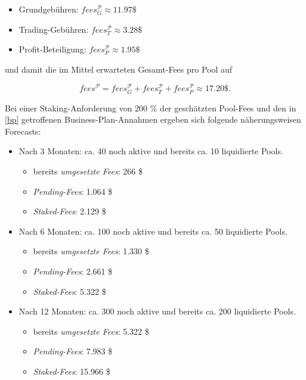 \begin{Fazit}
\begin{itemize}
	\item Grundgebühren: $fees_{G}^{\mathcal{P}} \approx 11.97\$ $
	\item Trading-Gebühren: $fees_{T}^{\mathcal{P}} \approx 3.28 \$ $
	\item Profit-Beteiligung: $fees_{P}^{\mathcal{P}} \approx 1.95 \$ $
\end{itemize}

und damit die im Mittel erwarteten Gesamt-Fees pro Pool auf

\begin{equation*}
  fees^{\mathcal{P}} = fees_{G}^{\mathcal{P}} + fees_{T}^{\mathcal{P}} + fees_{P}^{\mathcal{P}} \approx 17.20 \$. 
\end{equation*}

\vspace{0.67cm}

Bei einer Staking-Anforderung von 200 \% der geschätzten Pool-Fees  und den in \ref{bp} getroffenen Business-Plan-Annahmen ergeben sich folgende näherungsweisen Forecasts:

\begin{itemize}
	\item Nach 3 Monaten: ca. 40 noch aktive und bereits ca. 10 liquidierte Pools.
	\begin{itemize}
		\item bereits \textit{umgesetzte Fees}: 266 \$ 
		\item \textit{Pending-Fees}: 1.064 \$ 
		\item \textit{Staked-Fees}: 2.129 \$ 
	\end{itemize}
	\item Nach 6 Monaten: ca. 100 noch aktive und bereits ca. 50 liquidierte Pools.
	\begin{itemize}
		\item bereits \textit{umgesetzte Fees}: 1.330 \$ 
		\item \textit{Pending-Fees}: 2.661 \$ 
		\item \textit{Staked-Fees}: 5.322 \$ 
	\end{itemize}
	\item Nach 12 Monaten: ca. 300 noch aktive und bereits ca. 200 liquidierte Pools.
	\begin{itemize}
		\item bereits \textit{umgesetzte Fees}: 5.322 \$ 
		\item \textit{Pending-Fees}: 7.983 \$ 
		\item \textit{Staked-Fees}: 15.966 \$ 
	\end{itemize}	 
\end{itemize}


\end{Fazit}
